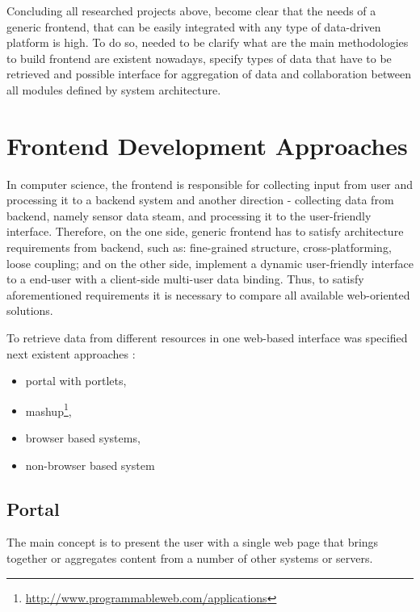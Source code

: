     Concluding all researched projects above, become clear that the needs of a generic frontend, that can be easily integrated with any type of data-driven platform is high. To do so, needed to be clarify what are the main methodologies to build frontend are existent nowadays, specify types of data that have to be retrieved and possible interface for aggregation of data and collaboration between all modules defined by system architecture.

\section{Frontend Development Approaches}
In computer science, the frontend is responsible for collecting input from user and processing it to a backend system and another direction - collecting data from backend, namely sensor data steam, and processing it to the user-friendly interface. Therefore, on the one side, generic frontend has to satisfy architecture requirements from backend, such as: fine-grained structure, cross-platforming, loose coupling; and on the other side, implement a dynamic user-friendly interface to a end-user with a client-side multi-user data binding. Thus, to satisfy aforementioned requirements it is necessary to compare all available web-oriented solutions.

To retrieve data from different resources in one web-based interface was specified next existent approaches :
\begin{itemize}
 \item portal with portlets,
 \item mashup\footnote{\url{http://www.programmableweb.com/applications}},
 \item browser based systems,
 \item non-browser based system
\end{itemize}

	\subsection{Portal}
		The main concept is to present the user with a single web page that brings together or aggregates content from a number of other systems or servers. 

